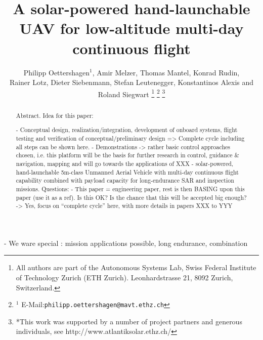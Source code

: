\documentclass[letterpaper, 10 pt, conference]{ieeeconf}  %
\title{\LARGE \bf A solar-powered hand-launchable UAV for low-altitude multi-day continuous flight}
\author{Philipp Oettershagen$^{1}$, Amir Melzer, Thomas Mantel, Konrad Rudin, \\ Rainer Lotz, Dieter Siebenmann, Stefan Leutenegger, Konstantinos Alexis and Roland Siegwart%
\thanks{All authors are part of the Autonomous Systems Lab, Swiss Federal Institute of Technology Zurich (ETH Zurich). Leonhardstrasse 21, 8092 Zurich, Switzerland. }
\thanks{$^{1}$ E-Mail:{\tt philipp.oettershagen@mavt.ethz.ch}}%
\thanks{*This work was supported by a number of project partners and generous individuals, see http://www.atlantiksolar.ethz.ch/  }%
 }
\begin{document}
\maketitle
\thispagestyle{empty}
\pagestyle{empty}

\begin{abstract}

Abstract. Idea for this paper:

 - Conceptual design, realization/integration, development of onboard systems, flight testing and verification of conceptual/preliminary design => Complete cycle including all steps can be shown here.
   - Demonstrations -> rather basic control approaches chosen, i.e. this platform will be the basis for further research in control, guidance \& navigation, mapping and will go towards the applications of XXX
    - solar-powered, hand-launchable 5m-class Unmanned Aerial Vehicle with multi-day continuous flight capability combined with payload capacity for long-endurance SAR and inspection missions.
Questions:
      - This paper = engineering paper, rest is then BASING upon this paper (use it as a ref). Is this OK? Is the chance that this will be accepted big enough? -> Yes, focus on ``complete cycle'' here, with more details in papers XXX to YYY

\end{abstract}


 - We ware special : mission applications possible, long endurance, combination





\end{document}

